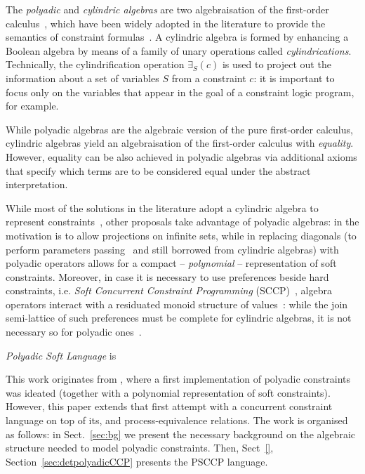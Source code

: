 \documentclass{llncs}
\begin{document}
The \emph{polyadic}  and  \emph{cylindric algebras} are two algebraisation of  the first-order calculus~\cite{cylalgebraic}, which have been widely  adopted in the literature to provide the semantics of constraint formulas~\cite{fgcs92,popl91}. A cylindric algebra is formed by enhancing a Boolean algebra by means of a family of unary operations called \emph{cylindrications}. Technically, the cylindrification operation $\exists_S(c)$ is used to project out the information about a set of variables $S$ from a constraint $c$: it is important to focus only on  the variables that appear in the goal of a constraint logic program, for example.

While polyadic algebras are the algebraic version of the pure first-order calculus, cylindric algebras yield an algebraisation of the first-order calculus with \emph{equality}. However, equality can be also achieved in polyadic algebras via additional axioms that specify which terms are to be considered equal under the abstract interpretation.

 While most of the solutions in the literature adopt a cylindric algebra to represent constraints~\cite{popl91}, other proposals take advantage of polyadic algebras: in \cite{fgcs92} the motivation is to allow projections on infinite sets, while in  \cite{festcatuscia} replacing diagonals (to perform parameters passing~\cite{popl91} and still borrowed from cylindric algebras) with polyadic operators allows for a compact – \emph{polynomial} – representation of soft constraints.  Moreover, in case it is necessary to use preferences beside hard constraints, i.e. \emph{Soft Concurrent Constraint Programming} (SCCP)~\cite{jacm97,jlamp17}, algebra operators interact with a residuated monoid structure of values~\cite{ipl17}: while the join semi-lattice of such preferences must be complete for cylindric algebras,  it is not necessary so for polyadic ones~\cite{festcatuscia}.

\emph{Polyadic Soft Language} is 

This work originates from \cite{festcatuscia}, where a first implementation of polyadic constraints was ideated (together with a polynomial representation of soft constraints). However, this paper extends that first attempt with a concurrent constraint language on top of its, and process-equivalence relations.
The work is organised as  follows: in Sect.~\ref{sec:bg} we present the necessary background on the algebraic structure needed to model polyadic constraints. Then, Sect~\ref{}, 
Section~\ref{sec:detpolyadicCCP} presents the PSCCP language. 
\end{document}
